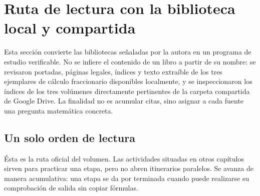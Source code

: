 \section{Ruta de lectura con la biblioteca local y compartida}
\label{sec:ruta-biblioteca-local-drive}

Esta sección convierte las bibliotecas señaladas por la autora en un programa
de estudio verificable. No se infiere el contenido de un libro a partir de su
nombre: se revisaron portadas, páginas legales, índices y texto extraíble de
los tres ejemplares de cálculo fraccionario disponibles localmente, y se
inspeccionaron los índices de los tres volúmenes directamente pertinentes de
la carpeta compartida de Google Drive. La finalidad no es acumular citas, sino
asignar a cada fuente una pregunta matemática concreta.

\subsection{Un solo orden de lectura}
\label{sec:ruta-unica-estudio}

Ésta es la ruta oficial del volumen. Las actividades situadas en otros
capítulos sirven para practicar una etapa, pero no abren itinerarios
paralelos. Se avanza de manera acumulativa: una etapa se da por terminada
cuando puede realizarse su comprobación de salida sin copiar fórmulas.

